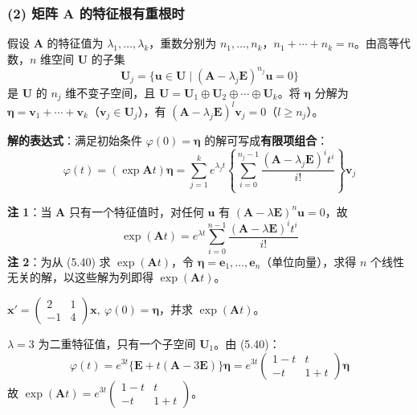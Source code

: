 \subsubsection{(2) 矩阵 A 的特征根有重根时}

假设 $\mathbf{A}$ 的特征值为 $\lambda_1, \ldots, \lambda_k$，重数分别为 $n_1, \ldots, n_k$，$n_1 + \cdots + n_k = n$。由高等代数，$n$ 维空间 $\mathbf{U}$ 的子集
\begin{equation}\mathbf{U}_j = \{\mathbf{u} \in \mathbf{U} \mid (\mathbf{A} - \lambda_j\mathbf{E})^{n_j}\mathbf{u} = 0\} \tag{5.36}\end{equation}
是 $\mathbf{U}$ 的 $n_j$ 维不变子空间，且 $\mathbf{U} = \mathbf{U}_1 \oplus \mathbf{U}_2 \oplus \cdots \oplus \mathbf{U}_k$。将 $\boldsymbol{\eta}$ 分解为 $\boldsymbol{\eta} = \mathbf{v}_1 + \cdots + \mathbf{v}_k$（$\mathbf{v}_j \in \mathbf{U}_j$），有 $(\mathbf{A} - \lambda_j\mathbf{E})^l\mathbf{v}_j = 0$（$l \ge n_j$）。

\textbf{解的表达式}：满足初始条件 $\varphi(0) = \boldsymbol{\eta}$ 的解可写成\textbf{有限项组合}：
\begin{equation}\varphi(t) = (\exp\mathbf{A}t)\boldsymbol{\eta} = \sum_{j=1}^{k} e^{\lambda_j t}\left\{\sum_{i=0}^{n_j - 1}\frac{(\mathbf{A} - \lambda_j\mathbf{E})^i t^i}{i!}\right\}\mathbf{v}_j \tag{5.40}\end{equation}

\begin{remark}
\textbf{注 1}：当 $\mathbf{A}$ 只有一个特征值时，对任何 $\mathbf{u}$ 有 $(\mathbf{A} - \lambda\mathbf{E})^n\mathbf{u} = 0$，故
\begin{equation}\exp(\mathbf{A}t) = e^{\lambda t}\sum_{i=0}^{n-1}\frac{(\mathbf{A} - \lambda\mathbf{E})^i t^i}{i!} \tag{5.41}\end{equation}
\textbf{注 2}：为从 (5.40) 求 $\exp(\mathbf{A}t)$，令 $\boldsymbol{\eta} = \mathbf{e}_1, \ldots, \mathbf{e}_n$（单位向量），求得 $n$ 个线性无关的解，以这些解为列即得 $\exp(\mathbf{A}t)$。
\end{remark}

\begin{example}
$\mathbf{x}' = \begin{pmatrix} 2 & 1 \\ -1 & 4 \end{pmatrix}\mathbf{x}, \ \varphi(0) = \boldsymbol{\eta}$，并求 $\exp(\mathbf{A}t)$。
\end{example}

\begin{solution}
$\lambda = 3$ 为二重特征值，只有一个子空间 $\mathbf{U}_1$。由 (5.40)：
$$\varphi(t) = e^{3t}\{\mathbf{E} + t(\mathbf{A} - 3\mathbf{E})\}\boldsymbol{\eta} = e^{3t}\begin{pmatrix} 1-t & t \\ -t & 1+t \end{pmatrix}\boldsymbol{\eta}$$
故 $\exp(\mathbf{A}t) = e^{3t}\begin{pmatrix} 1-t & t \\ -t & 1+t \end{pmatrix}$。
\end{solution}

